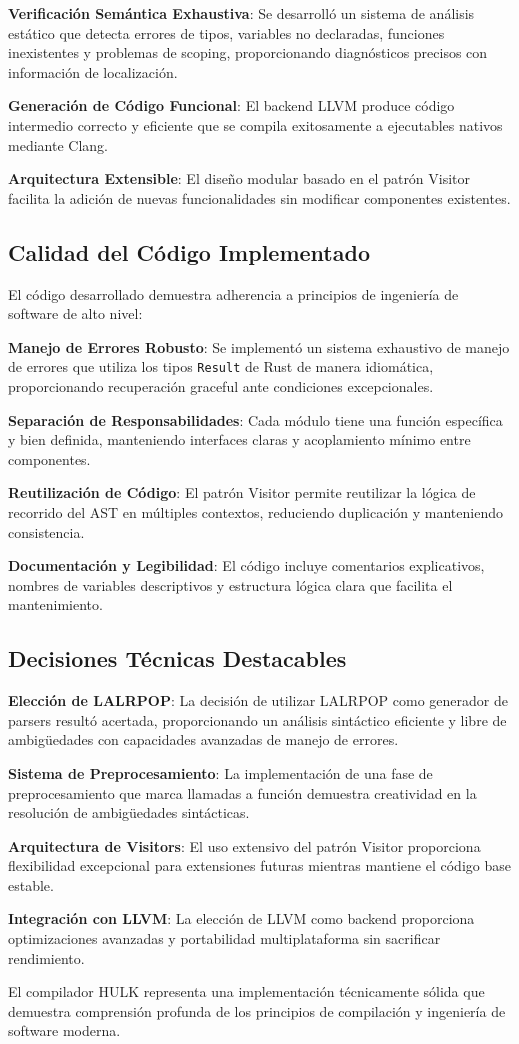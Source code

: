 \documentclass[12pt,a4paper]{article}
\begin{document}
\textbf{Verificación Semántica Exhaustiva}: Se desarrolló un sistema de análisis estático que detecta errores de tipos, variables no declaradas, funciones inexistentes y problemas de scoping, proporcionando diagnósticos precisos con información de localización.

\textbf{Generación de Código Funcional}: El backend LLVM produce código intermedio correcto y eficiente que se compila exitosamente a ejecutables nativos mediante Clang.

\textbf{Arquitectura Extensible}: El diseño modular basado en el patrón Visitor facilita la adición de nuevas funcionalidades sin modificar componentes existentes.

\subsection{Calidad del Código Implementado}

El código desarrollado demuestra adherencia a principios de ingeniería de software de alto nivel:

\textbf{Manejo de Errores Robusto}: Se implementó un sistema exhaustivo de manejo de errores que utiliza los tipos \texttt{Result} de Rust de manera idiomática, proporcionando recuperación graceful ante condiciones excepcionales.

\textbf{Separación de Responsabilidades}: Cada módulo tiene una función específica y bien definida, manteniendo interfaces claras y acoplamiento mínimo entre componentes.

\textbf{Reutilización de Código}: El patrón Visitor permite reutilizar la lógica de recorrido del AST en múltiples contextos, reduciendo duplicación y manteniendo consistencia.

\textbf{Documentación y Legibilidad}: El código incluye comentarios explicativos, nombres de variables descriptivos y estructura lógica clara que facilita el mantenimiento.

\subsection{Decisiones Técnicas Destacables}

\textbf{Elección de LALRPOP}: La decisión de utilizar LALRPOP como generador de parsers resultó acertada, proporcionando un análisis sintáctico eficiente y libre de ambigüedades con capacidades avanzadas de manejo de errores.

\textbf{Sistema de Preprocesamiento}: La implementación de una fase de preprocesamiento que marca llamadas a función demuestra creatividad en la resolución de ambigüedades sintácticas.

\textbf{Arquitectura de Visitors}: El uso extensivo del patrón Visitor proporciona flexibilidad excepcional para extensiones futuras mientras mantiene el código base estable.

\textbf{Integración con LLVM}: La elección de LLVM como backend proporciona optimizaciones avanzadas y portabilidad multiplataforma sin sacrificar rendimiento.

El compilador HULK representa una implementación técnicamente sólida que demuestra comprensión profunda de los principios de compilación y ingeniería de software moderna.
\end{document}
